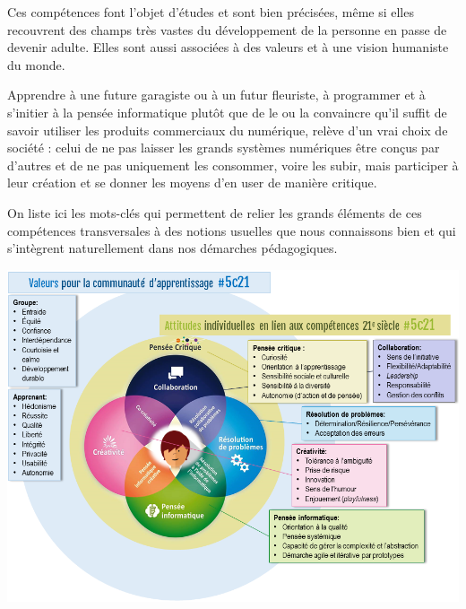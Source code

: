 Ces compétences font l'objet d'études et sont bien précisées, même si elles recouvrent des champs très vastes du développement de la personne en passe de devenir adulte. Elles sont aussi associées à des valeurs et à une vision humaniste du monde.

Apprendre à une future garagiste ou à un futur fleuriste, à programmer et à s'initier à la pensée informatique plutôt que de le ou la convaincre qu'il suffit de savoir utiliser les produits commerciaux du numérique, relève d'un vrai choix de société : celui de ne pas laisser les grands systèmes numériques être conçus par d'autres et de ne pas uniquement les consommer, voire les subir, mais participer à leur création et se donner les moyens d'en user de manière critique.




On liste ici les mots-clés qui permettent de relier les grands éléments de ces compétences transversales à des notions usuelles que nous connaissons bien et qui s'intègrent naturellement dans nos démarches pédagogiques.

\begin{fullwidth}
\includegraphics[width=\linewidth]{./Images/Chapter00/cocreatic-comment.png}
\end{fullwidth}

